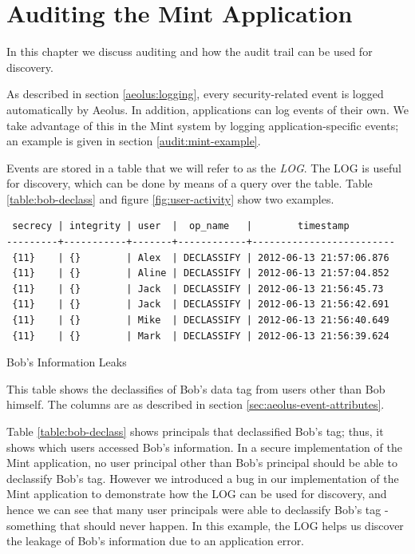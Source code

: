 \chapter{Auditing the Mint Application}
\label{mint:auditing}

In this chapter we discuss auditing and how the audit trail can be used for discovery.

As described in section \ref{aeolus:logging}, every security-related event is logged automatically by Aeolus. In addition, applications can log events of their own. We take advantage of this in the Mint system by logging application-specific events; an example is given in section \ref{audit:mint-example}.

Events are stored in a table that we will refer to as the \emph{LOG}. The LOG is useful for discovery, which can be done by means of a query over the table. Table \ref{table:bob-declass} and figure \ref{fig:user-activity} show two examples.

\begin{table}[h]
\begin{verbatim}
 secrecy | integrity | user  |  op_name   |        timestamp        
---------+-----------+-------+------------+-------------------------
 {11}    | {}        | Alex  | DECLASSIFY | 2012-06-13 21:57:06.876
 {11}    | {}        | Aline | DECLASSIFY | 2012-06-13 21:57:04.852
 {11}    | {}        | Jack  | DECLASSIFY | 2012-06-13 21:56:45.73
 {11}    | {}        | Jack  | DECLASSIFY | 2012-06-13 21:56:42.691
 {11}    | {}        | Mike  | DECLASSIFY | 2012-06-13 21:56:40.649
 {11}    | {}        | Mark  | DECLASSIFY | 2012-06-13 21:56:39.624
\end{verbatim}
\caption*{Bob's Information Leaks}
\caption[Bob's Information Leaks]{This table shows the declassifies of Bob's data tag from users other than Bob himself. The columns are as described in section \ref{sec:aeolus-event-attributes}.}
\label{table:bob-declass}
\end{table}

Table \ref{table:bob-declass} shows principals that declassified Bob's tag; thus, it shows which users accessed Bob's information. In a secure implementation of the Mint application, no user principal other than Bob's principal should be able to declassify Bob's tag. However we introduced a bug in our implementation of the Mint application to demonstrate how the LOG can be used for discovery, and hence we can see that many user principals were able to declassify Bob's tag - something that should never happen. In this example, the LOG helps us discover the leakage of Bob's information due to an application error.

